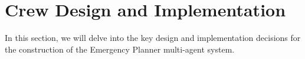 \section{Crew Design and Implementation}
\label{sec:crew_design}
In this section, we will delve into the key design and implementation decisions for the construction of the Emergency Planner multi-agent system.